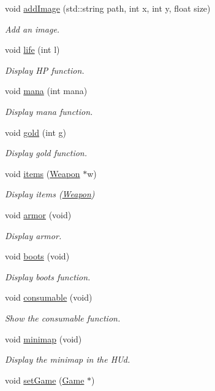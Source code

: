 \begin{DoxyCompactItemize}
void \hyperlink{class_h_u_d_window_aee140416af161a6d8acc2b0c83370088}{add\-Image} (std\-::string path, int x, int y, float size)
\begin{DoxyCompactList}\small\item\em Add an image. \end{DoxyCompactList}\item 
void \hyperlink{class_h_u_d_window_a8fc917fbfae792d046e90448c963100a}{life} (int l)
\begin{DoxyCompactList}\small\item\em Display H\-P function. \end{DoxyCompactList}\item 
void \hyperlink{class_h_u_d_window_a6eb79b572849709a329e65ed2afd2e9e}{mana} (int mana)
\begin{DoxyCompactList}\small\item\em Display mana function. \end{DoxyCompactList}\item 
void \hyperlink{class_h_u_d_window_a4eb34de71e2ea671f637381ac255edab}{gold} (int g)
\begin{DoxyCompactList}\small\item\em Display gold function. \end{DoxyCompactList}\item 
void \hyperlink{class_h_u_d_window_a9edf25a0b1cf568aa3f338281d81d99a}{items} (\hyperlink{class_weapon}{Weapon} $\ast$w)
\begin{DoxyCompactList}\small\item\em Display items (\hyperlink{class_weapon}{Weapon}) \end{DoxyCompactList}\item 
void \hyperlink{class_h_u_d_window_a1c6965adb9fdd22b230d20b26fef5ac0}{armor} (void)
\begin{DoxyCompactList}\small\item\em Display armor. \end{DoxyCompactList}\item 
void \hyperlink{class_h_u_d_window_acd4fdbfd1c2562384b84d3bcda80fea1}{boots} (void)
\begin{DoxyCompactList}\small\item\em Display boots function. \end{DoxyCompactList}\item 
void \hyperlink{class_h_u_d_window_a378bc8269cacb151f68cfb37114e0c38}{consumable} (void)
\begin{DoxyCompactList}\small\item\em Show the consumable function. \end{DoxyCompactList}\item 
void \hyperlink{class_h_u_d_window_a8264836f3c55d8211f4e5166e9049628}{minimap} (void)
\begin{DoxyCompactList}\small\item\em Display the minimap in the H\-Ud. \end{DoxyCompactList}\item 
void \hyperlink{class_h_u_d_window_a5baefc7b585437df2639fda359c3cf46}{set\-Game} (\hyperlink{class_game}{Game} $\ast$)
\end{DoxyCompactItemize}


